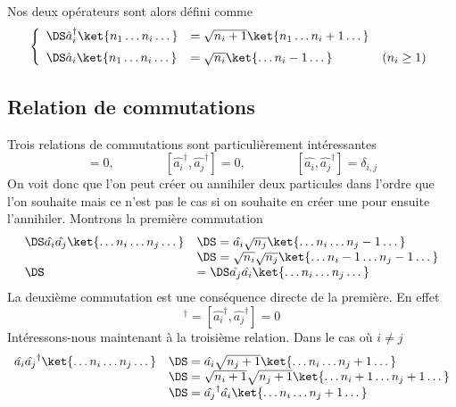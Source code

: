 Nos deux opérateurs sont alors défini comme
\begin{equation}
\left\{\begin{array}{ll}
\DS\hat{a}_i^\dagger \ket{n_1\dots n_i\dots} &= \sqrt{n_i+1}\ket{n_1\dots n_i+1\dots}\vspace{2mm}\\
\DS\hat{a}_i\ket{n_1\dots n_i\dots} &= \sqrt{n_i}\ket{\dots n_i-1\dots}\qquad\qquad (n_i\geq 1)
\end{array}\right.
\end{equation}

\subsection{Relation de commutations}
Trois relations de commutations sont particulièrement intéressantes
\begin{equation}
[\hat{a_i},\hat{a_j}]=0,\qquad\qquad[\hat{a_i}^\dagger,\hat{a_j}^\dagger]=0,\qquad\qquad [\hat{a_i},\hat{a_j}^\dagger]=\delta_{i,j}
\end{equation}
On voit donc que l'on peut créer ou annihiler deux particules dans l'ordre que l'on souhaite mais ce n'est pas le cas si 
on souhaite en créer une pour ensuite l'annihiler. Montrons la première commutation
\begin{equation}
\begin{array}{ll}
\DS\hat{a_i}\hat{a_j}\ket{\dots n_i\dots n_j\dots} &\DS= \hat{a_i}\sqrt{n_j}\ket{\dots n_i\dots n_j-1\dots}\\&\DS= \sqrt{n_i}\sqrt{n_j}\ket{\dots n_i-1\dots n_j-1\dots}\\
\DS&= \DS\hat{a_j}\hat{a_i}\ket{\dots n_i\dots n_j\dots} 
\end{array}
\end{equation}
La deuxième commutation est une conséquence directe de la première. En effet
\begin{equation}
[\hat{a_i},\hat{a_j}]^\dagger=[\hat{a_i}^\dagger,\hat{a_j}^\dagger]=0
\end{equation}
Intéressons-nous maintenant à la troisième relation. Dans le cas où $i\neq j$
\begin{equation}
\begin{array}{ll}
\hat{a_i}\hat{a_j}^\dagger\ket{\dots n_i\dots n_j\dots} &\DS = \hat{a_i}\sqrt{n_j+1}\ket{\dots n_i\dots n_j+1\dots}\\
&\DS = \sqrt{n_i+1}\sqrt{n_j+1}\ket{\dots n_i+1\dots n_j+1\dots}\\
&\DS = \hat{a_j}^\dagger\hat{a_i}\ket{\dots n_i\dots n_j+1\dots}
\end{array}
\end{equation}
